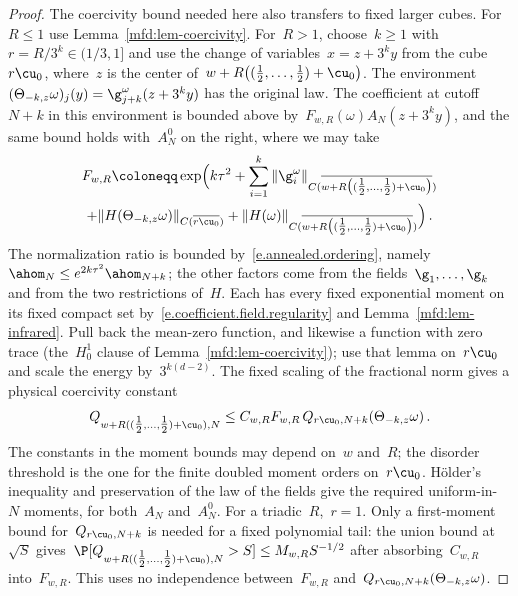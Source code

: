 \documentclass[11pt]{amsart}
\begin{document}
\begin{proof}
\smallskip

The coercivity bound needed here also transfers to fixed larger cubes. For~$R\leq1$ use Lemma~\ref{mfd:lem-coercivity}. For~$R>1$, choose~$k\geq1$ with~$r=R/3^k\in(1/3,1]$ and use the change of variables~$x=z+3^ky$ from the cube~$r\cu_0$, where~$z$ is the center of~$w+R\bigl((\tfrac12,\dots,\tfrac12)+\cu_0\bigr)$. The environment~$(\Theta_{-k,z}\omega)_j(y)=\g^\omega_{j+k}(z+3^ky)$ has the original law. The coefficient at cutoff~$N+k$ in this environment is bounded above by~$F_{w,R}(\omega)A_N(z+3^ky)$, and the same bound holds with~$A_N^0$ on the right, where we may take
\begin{multline*}
	F_{w,R}\coloneqq\exp\Bigl(k\tau^2+\sum_{i=1}^k\|\g^\omega_i\|_{C(\overline{w+R\bigl((\tfrac12,\dots,\tfrac12)+\cu_0\bigr)})}\\
	+\|H(\Theta_{-k,z}\omega)\|_{C(\overline{r\cu_0})}
	+\|H(\omega)\|_{C(\overline{w+R\bigl((\tfrac12,\dots,\tfrac12)+\cu_0\bigr)})}\Bigr)\,.
\end{multline*}
The normalization ratio is bounded by~\eqref{e.annealed.ordering}, namely~$\ahom_N\leq e^{2k\tau^2}\ahom_{N+k}$; the other factors come from the fields~$\g_1,\dots,\g_k$ and from the two restrictions of~$H$. Each has every fixed exponential moment on its fixed compact set by~\eqref{e.coefficient.field.regularity} and Lemma~\ref{mfd:lem-infrared}. Pull back the mean-zero function, and likewise a function with zero trace (the~$H^1_0$ clause of Lemma~\ref{mfd:lem-coercivity}); use that lemma on~$r\cu_0$ and scale the energy by~$3^{k(d-2)}$. The fixed scaling of the fractional norm gives a physical coercivity constant
\begin{equation*}
	Q_{w+R((\tfrac12,\dots,\tfrac12)+\cu_0),N}\leq C_{w,R}F_{w,R}\,Q_{r\cu_0,N+k}(\Theta_{-k,z}\omega)\,.
\end{equation*}
The constants in the moment bounds may depend on~$w$ and~$R$; the disorder threshold is the one for the finite doubled moment orders on~$r\cu_0$. H\"older's inequality and preservation of the law of the fields give the required uniform-in-~$N$ moments, for both~$A_N$ and~$A_N^0$. For a triadic~$R$,~$r=1$. Only a first-moment bound for~$Q_{r\cu_0,N+k}$ is needed for a fixed polynomial tail: the union bound at~$\sqrt S$ gives~$\P[Q_{w+R((\tfrac12,\dots,\tfrac12)+\cu_0),N}>S]\leq M_{w,R}S^{-1/2}$ after absorbing~$C_{w,R}$ into~$F_{w,R}$. This uses no independence between~$F_{w,R}$ and~$Q_{r\cu_0,N+k}(\Theta_{-k,z}\omega)$.

\smallskip


\end{proof}
\end{document}
